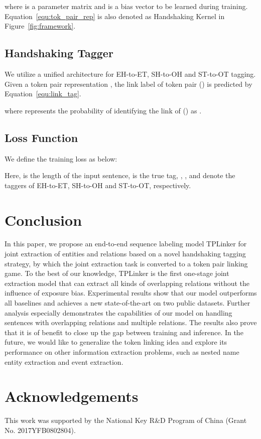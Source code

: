 \documentclass[11pt]{article}
\begin{document}
where  is a parameter matrix and  is a bias vector to be learned during training.
Equation~\ref{equ:tok_pair_rep} is also denoted as Handshaking Kernel in Figure~\ref{fig:framework}.


\subsection{Handshaking Tagger}
We utilize a unified architecture for EH-to-ET, SH-to-OH and ST-to-OT tagging. 
Given a token pair representation , the link label of token pair () is predicted by Equation~\ref{equ:link_tag}.


where  represents the probability of identifying the link of () as . 

\subsection{Loss Function}
We define the training loss as below:






Here,  is the length of the input sentence,  is the true tag, , , and  denote the taggers of EH-to-ET, SH-to-OH and ST-to-OT, respectively. 
%
  \section{Conclusion}
In this paper, we propose an end-to-end sequence labeling model TPLinker for joint extraction of entities and relations based on a novel handshaking tagging strategy, by which the joint extraction task is converted to a token pair linking game. 
To the best of our knowledge, TPLinker is the first one-stage joint extraction model that can extract all kinds of overlapping relations without the influence of exposure bias.
Experimental results show that our model outperforms all baselines and achieves a new state-of-the-art on two public datasets. 
Further analysis especially demonstrates the capabilities of our model on handling sentences with overlapping relations and multiple relations. 
The results also prove that it is of benefit to close up the gap between training and inference. 
In the future, we would like to generalize the token linking idea and explore its performance on other information extraction problems, such as nested name entity extraction and event extraction.  
\section*{Acknowledgements}
This work was supported by the National Key R\&D Program of China (Grant No. 2017YFB0802804).





\end{document}
